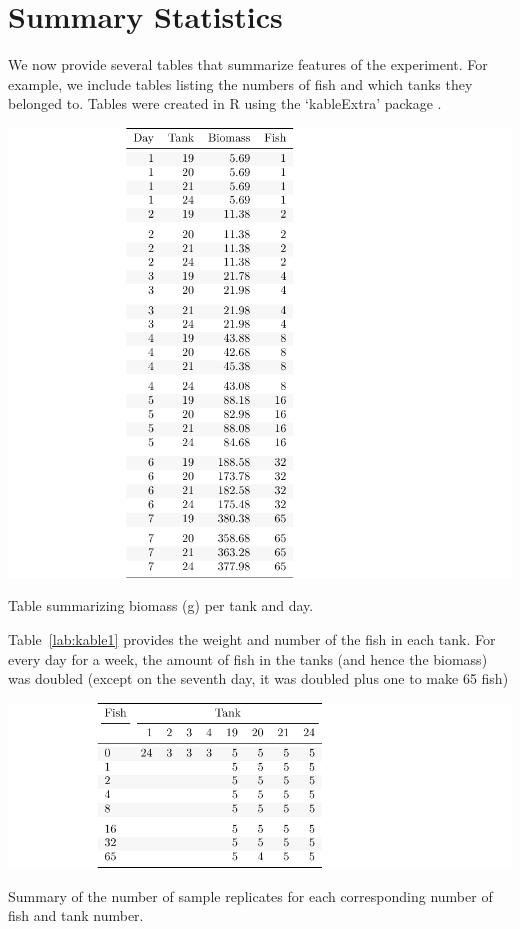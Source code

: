 \section{Summary Statistics}

We now provide several tables that summarize features of the experiment. For example, we include tables listing the numbers of fish and which tanks they belonged to. Tables were created in R using the `kableExtra' package \citep{kable}.

\begin{table}[H]
\includegraphics{Chapter3Images/kable1test.pdf}
\caption{\hspace{1mm}Table summarizing biomass (g) per tank and day.}
\label{lab:kable1}
\end{table}

Table~\ref{lab:kable1} provides the weight and number of the fish in each tank. For every day for a week, the amount of fish in the tanks (and hence the biomass) was doubled (except on the seventh day, it was doubled plus one to make 65 fish)


\begin{table}[H]
\includegraphics{Chapter3Images/kable2fixed2.pdf}
\caption{ \hspace{1mm}Summary of the number of sample replicates for each corresponding number of fish and tank number.
}
\label{lab:kabel2}
\end{table}

